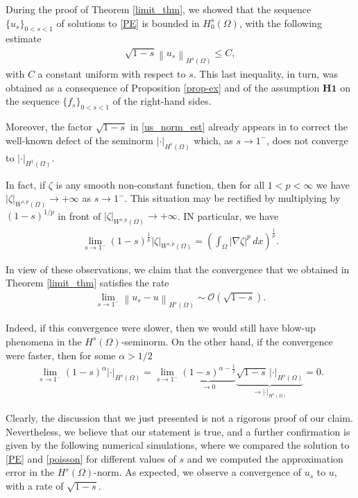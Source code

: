 \documentclass[reqno,twoside]{amsart}
\numberwithin{equation}{section}
\newcommand{\norm}[2]{{\left\|#1\right\|}_{#2}}
\begin{document}
During the proof of Theorem \eqref{limit_thm}, we showed that the sequence $\{u_s\}_{0<s<1}$ of solutions to \eqref{PE} is bounded in $H_0^s(\Omega)$, with the following estimate 
\begin{align}\label{us_norm_est}
	\sqrt{1-s}\norm{u_s}{H^s(\Omega)}\leq C,
\end{align}
with $C$ a constant uniform with respect to $s$. This last inequality, in turn, was obtained as a consequence of Proposition \ref{prop-ex} and of the assumption $\mathbf{H1}$ on the sequence $\{f_s\}_{0<s<1}$ of the right-hand sides. 

Moreover, the factor $\sqrt{1-s}$ in \eqref{us_norm_est} already appears in \cite{bourgain2001another} to correct the well-known defect
of the seminorm $|\cdot|_{H^s(\Omega)}$ which, as $s\to 1^-$, does not converge to $|\cdot|_{H^1(\Omega)}$. 

In fact, if $\zeta$ is any smooth non-constant function, then for all $1< p<\infty$ we have $|\zeta|_{W^{s,p}(\Omega)}\to +\infty$ as $s\to 1^-$. This situation may be rectified by multiplying by $(1 -s)^{1/p}$ in front of $|\zeta|_{W^{s,p}(\Omega)}\to +\infty$. IN particular, we have 
\begin{align*}
	\lim_{s\to 1^-} (1-s)^{\frac 1p}|\zeta|_{W^{s,p}(\Omega)} = \left(\int_\Omega |\nabla\zeta|^p\,dx\right)^{\frac 1p}. 
\end{align*}

In view of these observations, we claim that the convergence that we obtained in Theorem \ref{limit_thm} satisfies the rate
\begin{align*}
	\lim_{s\to 1^-}\norm{u_s-u}{H^s(\Omega)} \sim \mathcal O(\sqrt{1-s}).
\end{align*}

Indeed, if this convergence were slower, then we would still have blow-up phenomena in the $H^s(\Omega)$-seminorm. On the other hand, if the convergence were faster, then for some $\alpha>1/2$
\begin{align*}
	\lim_{s\to 1^-}(1-s)^{\alpha}|\cdot|_{H^s(\Omega)} = \lim_{s\to 1^-}\underbrace{(1-s)^{\alpha-\frac 12}}_{\to 0}\underbrace{\sqrt{1-s}\,|\cdot|_{H^s(\Omega)}}_{\to |\cdot|_{H^1(\Omega)}}  = 0.
\end{align*}

Clearly, the discussion that we just presented is not a rigorous proof of our claim. Nevertheless, we believe that our statement is true, and a further confirmation is given by the following numerical simulations, where we compared the solution to \eqref{PE} and \eqref{poisson} for different values of $s$ and we computed the approximation error in the $H^s(\Omega)$-norm. As expected, we observe a convergence of $u_s$ to $u$, with a rate of $\sqrt{1-s}$.
\end{document}
